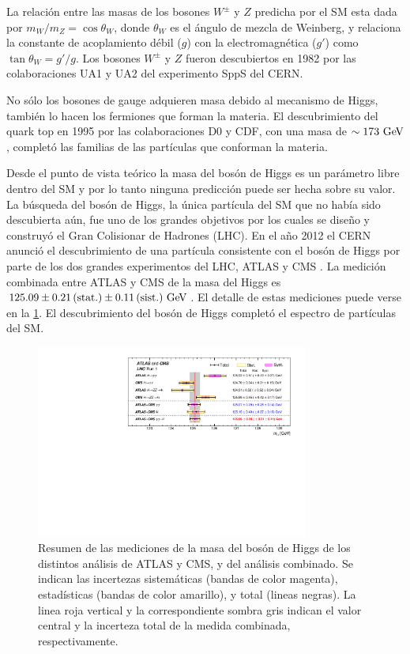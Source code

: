La relación entre las masas de los bosones $W^\pm$ y $Z$ predicha por el SM esta
dada por $m_W/m_Z = \cos \theta_W$, donde $\theta_W$ es el ángulo de
mezcla de Weinberg, y relaciona la constante de acoplamiento débil ($g$) con la
electromagnética ($g'$) como $\tan\theta_W = g'/g$. Los bosones $W^\pm$ y $Z$
fueron descubiertos en 1982 por las colaboraciones UA1 y UA2 del experimento
SppS del CERN.

No sólo los bosones de gauge adquieren masa debido al mecanismo de Higgs,
también lo hacen los fermiones que forman la materia. El descubrimiento del
quark top en 1995 por las colaboraciones D0 y CDF, con una masa de $\sim 173
\GeV$, completó las familias de las partículas que conforman la materia.

Desde el punto de vista teórico la masa del bosón de Higgs es un parámetro libre
dentro del SM y por lo tanto ninguna predicción puede ser hecha sobre su valor. La búsqueda
del bosón de Higgs, la única partícula del SM que no había sido descubierta
aún, fue uno de los grandes objetivos por los cuales se dise\~no y construyó el
Gran Colisionar de Hadrones (LHC). En el a\~no 2012 el CERN anunció el
descubrimiento de una partícula consistente con el bosón de Higgs por parte de
los dos grandes experimentos del LHC, ATLAS y CMS
\cite{Aad:2012tfa,Chatrchyan:2012ufa}. La medición combinada entre ATLAS y CMS
de la masa del Higgs es $125.09 \pm 0.21\, \text{(stat.)} \pm 0.11\, \text{(sist.)}
\gev$\cite{HiggsMass_ATLAS_CMS}.
El detalle de estas mediciones  puede verse en la \cref{fig:higgs_cms_atlas}.
El descubrimiento del bosón de Higgs completó el espectro de partículas del SM.

\begin{figure}[!htbp]
  \centering
  \includegraphics[width=0.8\textwidth]{figures/higgs_atlas_cms_mass}
  \caption{Resumen de las mediciones de la masa del bosón de Higgs de los
    distintos análisis de ATLAS y CMS, y del análisis combinado. Se indican las
    incertezas sistemáticas (bandas de color magenta), estadísticas (bandas de
    color amarillo), y total (lineas negras). La linea roja vertical y la
    correspondiente sombra gris indican el valor central y la incerteza total de
    la medida combinada, respectivamente\cite{HiggsMass_ATLAS_CMS}.}
  \label{fig:higgs_cms_atlas}
\end{figure}



